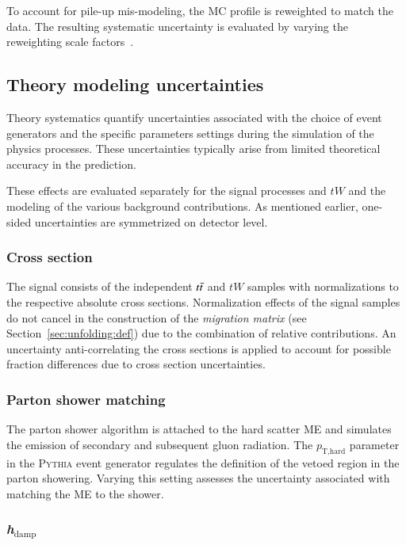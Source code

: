 To account for pile-up mis-modeling, the MC profile is reweighted to match the data. The resulting systematic uncertainty is evaluated by varying the reweighting scale factors~\cite{Buttinger:2014726}.

\subsection{Theory modeling uncertainties}
\label{sec:theory_modeling}
Theory systematics quantify uncertainties associated with the choice of event generators 
and the specific parameters settings during the simulation of the physics processes.
These uncertainties typically arise from limited theoretical accuracy in the prediction.

These effects are evaluated separately for
the signal processes \ttbar and $tW$
and the modeling of the various background contributions.
As mentioned earlier, one-sided uncertainties are symmetrized on detector level.

\subsubsection{Cross section}

The signal consists of the independent $t\bar{t}$ and $tW$ samples with
normalizations to the respective absolute cross sections.
Normalization effects of the signal samples do not cancel in the
construction of the \textit{migration matrix} (see Section~\ref{sec:unfolding:def})
due to the combination of relative contributions.
An uncertainty anti-correlating the cross sections is applied
to account for possible fraction differences due to cross section uncertainties.

\subsubsection{Parton shower matching}

The parton shower algorithm is attached to the hard scatter ME
and simulates the emission of secondary and subsequent
gluon radiation.
The $p_\text{T,hard}$ parameter in the \textsc{Pythia} event generator regulates the 
definition of the vetoed region in the parton showering.
Varying this setting assesses the uncertainty associated with matching the
ME to the shower.

\subsubsection{\textit{h}$_\text{damp}$}

